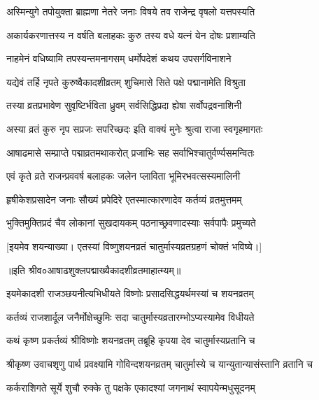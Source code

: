 \twolineshloka
{अस्मिन्युगे तपोयुक्ता ब्राह्मणा नेतरे जनाः}
{विषये तव राजेन्द्र वृषलो यत्तपस्यति} %

\twolineshloka
{अकार्यकरणात्तस्य न वर्षति बलाहकः}
{कुरु तस्य वधे यत्नं येन दोषः प्रशाम्यति} %


\twolineshloka
{नाहमेनं वधिष्यामि तपस्यन्तमनागसम्}
{धर्मोपदेशं कथय उपसर्गविनाशने} %


\twolineshloka
{यद्येवं तर्हि नृपते कुरुष्वैकादशीव्रतम्}
{शुचिमासे सिते पक्षे पद्मानामेति विश्रुता} %

\twolineshloka
{तस्या व्रतप्रभावेण सुवृष्टिर्भविता ध्रुवम्}
{सर्वसिद्धिप्रदा ह्येषा सर्वोपद्रवनाशिनी} %

\twolineshloka
{अस्या व्रतं कुरु नृप सप्रजः सपरिच्छदः}
{इति वाक्यं मुनेः श्रुत्वा राजा स्वगृहमागतः} %

\twolineshloka
{आषाढमासे सम्प्राप्ते पद्माव्रतमथाकरोत्}
{प्रजाभिः सह सर्वाभिश्चातुर्वर्ण्यसमन्वितः} %

\twolineshloka
{एवं कृते व्रते राजन्प्रववर्ष बलाहकः}
{जलेन प्लाविता भूमिरभवत्सस्यमालिनी} %

\twolineshloka
{हृषीकेशप्रसादेन जनाः सौख्यं प्रपेदिरे}
{एतस्मात्कारणादेव कर्तव्यं व्रतमुत्तमम्} %

\twolineshloka
{भुक्तिमुक्तिप्रदं चैव लोकानां सुखदायकम्}
{पठनाच्छ्रवणादस्याः सर्वपापैः प्रमुच्यते} %

[इयमेव शयन्याख्या। एतस्यां विष्णुशयनव्रतं चातुर्मास्यव्रतग्रहणं चोक्तं भविष्ये।]

॥इति श्रीव०आषाढशुक्लपद्माख्यैकादशीव्रतमाहात्म्यम्॥



\twolineshloka
{इयमेकादशी राजञ्छयनीत्यभिधीयते}
{विष्णोः प्रसादसिद्धयर्थमस्यां च शयनव्रतम्} %

\twolineshloka
{कर्तव्यं राजशार्दूल जनैर्मोक्षेच्छुमिः सदा}
{चातुर्मास्यव्रतारम्भोऽप्यस्यामेव विधीयते} %


\twolineshloka
{कथं कृष्ण प्रकर्तव्यं श्रीविष्णोः शयनव्रतम्}
{तब्रूहि कृपया देव चातुर्मास्यप्रतानि च} %

\twolineshloka
{श्रीकृष्ण उवाचशृणु पार्थ प्रवक्ष्यामि गोविन्दशयनव्रतम्}
{चातुर्मास्ये च यान्युतान्यासंस्तानि व्रतानि च} %

\twolineshloka
{कर्कराशिगते सूर्ये शुचौ रुक्के तु पक्षके}
{एकादश्यां जगनाथं स्वापयेन्मधुसूदनम्} %


